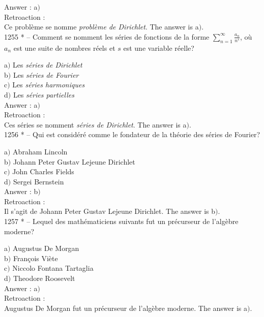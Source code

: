 ﻿\documentclass[letterpaper, 12pt]{article}
\begin{document}
Answer : a$)$\\

Retroaction : \\
Ce probl\`eme se nomme {\sl probl\`eme de Dirichlet}.
The answer is a$)$.\\

1255 * -- Comment se nomment les s\'eries de fonctions de la forme
$\sum_{n=1}^{\infty}\frac{a_n}{n^s}$, o\`u $a_n$ est une suite de
nombres r\'eels et $s$ est une variable r\'eelle?

a$)$ Les {\sl s\'eries de Dirichlet} \\
b$)$ Les {\sl s\'eries de Fourier} \\
c$)$ Les {\sl s\'eries harmoniques} \\
d$)$ Les {\sl s\'eries partielles}\\

Answer : a$)$\\

Retroaction : \\
Ces s\'eries se nomment {\sl s\'eries de Dirichlet}.
The answer is a$)$.\\

1256 * -- Qui est consid\'er\'e comme le fondateur de la {th\'eorie
des s\'eries de Fourier}?

a$)$ Abraham Lincoln \\
b$)$ Johann Peter Gustav Lejeune Dirichlet \\
c$)$ John Charles Fields \\
d$)$ Sergei Bernstein\\

Answer : b$)$\\

Retroaction : \\
Il s'agit de Johann Peter Gustav Lejeune Dirichlet.
The answer is b$)$.\\

1257 * -- Lequel des math\'ematiciens suivants fut un pr\'ecurseur
de l'alg\`ebre moderne?

a$)$ Augustus De Morgan \\
b$)$ Fran\c cois Vi\`ete \\
c$)$ Niccolo Fontana Tartaglia\\
d$)$ Theodore Roosevelt\\

Answer : a$)$\\

Retroaction : \\
Augustus De Morgan fut un pr\'ecurseur de l'alg\`ebre moderne.
The answer is a$)$.\\
\end{document}
